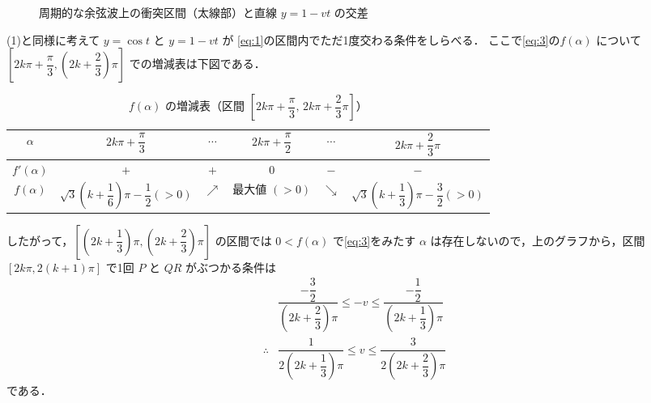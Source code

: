 \documentclass[../../main.tex]{subfiles}
\begin{document}
\begin{figure}[htb]
  \caption{周期的な余弦波上の衝突区間（太線部）と直線 $y = 1 - vt$ の交差}
  \label{fig:periodic_cosine_collision_intervals}
\end{figure}

(1)と同様に考えて $y = \cos t$ と $y = 1 - vt$ が
\cref{eq:1}の区間内でただ1度交わる条件をしらべる．
ここで\cref{eq:3}の$f(\alpha)$ について $\left[2k\pi+\dfrac{\pi}{3}, (2k+\dfrac{2}{3})\pi\right]$ での増減表は下図である．

\begin{table}[htb]
  \centering
  \caption{$f(\alpha)$ の増減表（区間 $\left[2k\pi + \dfrac{\pi}{3}, \, 2k\pi + \dfrac{2}{3}\pi\right]$）}
  \label{tab:f_alpha_general_interval}
  \renewcommand{\arraystretch}{1.5}
  \begin{tabular}{|c|c|c|c|c|c|}
    \hline
    $\alpha$ & $2k\pi + \dfrac{\pi}{3}$ & $\cdots$ & $2k\pi + \dfrac{\pi}{2}$ & $\cdots$ & $2k\pi + \dfrac{2}{3}\pi$ \\ \hline
    $f'(\alpha)$ & $+$ & $+$ & $0$ & $-$ & $-$ \\ \hline
    $f(\alpha)$  & $\sqrt{3}(k+\dfrac{1}{6})\pi-\dfrac{1}{2}(>0)$ & $\nearrow$ & 最大値 $(>0)$ & $\searrow$ & $ \sqrt{3}(k+\dfrac{1}{3})\pi - \dfrac{3}{2}(>0)$ \\ \hline
  \end{tabular}
\end{table}

したがって，$\left[(2k+\dfrac{1}{3})\pi, (2k+\dfrac{2}{3})\pi\right]$ の区間では $0 < f(\alpha)$ で\cref{eq:3}をみたす $\alpha$ は存在しないので，上のグラフから，区間 $[2k\pi, 2(k+1)\pi]$ で1回 $P$ と $QR$ がぶつかる条件は
\begin{align}
  & \dfrac{-\dfrac{3}{2}}{(2k+\dfrac{2}{3})\pi} \le -v \le \dfrac{-\dfrac{1}{2}}{(2k+\dfrac{1}{3})\pi} \\
  \therefore
  & \dfrac{1}{2(2k+\dfrac{1}{3})\pi} \le v \le \dfrac{3}{2(2k+\dfrac{2}{3})\pi} \label{eq:4}
\end{align}
である．
\end{document}
